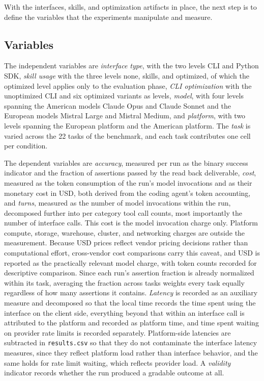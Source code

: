 \documentclass[
english,                 %
bibtex,                  %
]{kththesis}
\numberwithin{listing}{chapter}
\begin{document}
With the interfaces, skills, and optimization artifacts in place, the next step is to define the variables that the experiments manipulate and measure.

\subsection{Variables}
\label{sec:method_variables}
\glsresetall

The independent variables are \emph{interface type}, with the two levels \gls{CLI} and Python \gls{SDK}, \emph{skill usage} with the three levels none, skills, and optimized, of which the optimized level applies only to the evaluation phase, \emph{\gls{CLI} optimization} with the unoptimized \gls{CLI} and six optimized variants as levels, \emph{model}, with four levels spanning the American models Claude Opus and Claude Sonnet and the European models Mistral Large and Mistral Medium, and \emph{platform}, with two levels spanning the European platform and the American platform. The \emph{task} is varied across the 22 tasks of the benchmark, and each task contributes one cell per condition.

The dependent variables are \emph{accuracy}, measured per run as the binary success indicator and the fraction of assertions passed by the read back deliverable, \emph{cost}, measured as the token consumption of the run's model invocations and as their monetary cost in \gls{USD}, both derived from the coding agent's token accounting, and \emph{turns}, measured as the number of model invocations within the run, decomposed further into per category tool call counts, most importantly the number of interface calls. This cost is the model invocation charge only. Platform compute, storage, warehouse, cluster, and networking charges are outside the measurement. Because \gls{USD} prices reflect vendor pricing decisions rather than computational effort, cross-vendor cost comparisons carry this caveat, and \gls{USD} is reported as the practically relevant model charge, with token counts recorded for descriptive comparison. Since each run's assertion fraction is already normalized within its task, averaging the fraction across tasks weights every task equally regardless of how many assertions it contains. \emph{Latency} is recorded as an auxiliary measure and decomposed so that the local time records the time spent using the interface on the client side, everything beyond that within an interface call is attributed to the platform and recorded as platform time, and time spent waiting on provider rate limits is recorded separately. Platform-side latencies are subtracted in \texttt{results.csv} so that they do not contaminate the interface latency measures, since they reflect platform load rather than interface behavior, and the same holds for rate limit waiting, which reflects provider load. A \emph{validity} indicator records whether the run produced a gradable outcome at all.
\end{document}
